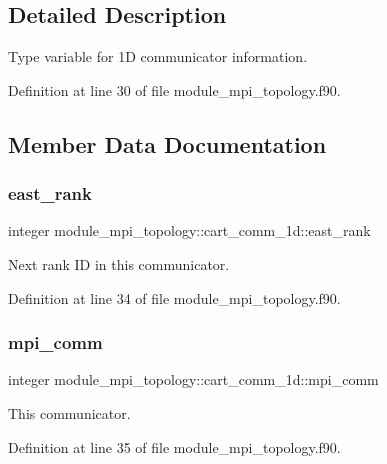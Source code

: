\subsection{Detailed Description}
Type variable for 1D communicator information. 

Definition at line 30 of file module\+\_\+mpi\+\_\+topology.\+f90.



\subsection{Member Data Documentation}
\mbox{\label{structmodule__mpi__topology_1_1cart__comm__1d_a80f98134dc3f4b14023b3fce5949f704}} 
\subsubsection{\texorpdfstring{east\_rank}{east\_rank}}
{\footnotesize\ttfamily integer module\+\_\+mpi\+\_\+topology\+::cart\+\_\+comm\+\_\+1d\+::east\+\_\+rank}



Next rank ID in this communicator. 



Definition at line 34 of file module\+\_\+mpi\+\_\+topology.\+f90.

\mbox{\label{structmodule__mpi__topology_1_1cart__comm__1d_a4520664bb889e137887f8b36d8f35449}} 
\subsubsection{\texorpdfstring{mpi\_comm}{mpi\_comm}}
{\footnotesize\ttfamily integer module\+\_\+mpi\+\_\+topology\+::cart\+\_\+comm\+\_\+1d\+::mpi\+\_\+comm}



This communicator. 



Definition at line 35 of file module\+\_\+mpi\+\_\+topology.\+f90.

